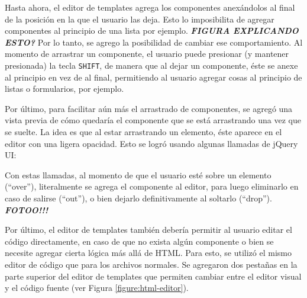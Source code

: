 \documentclass[12pt,titlepage,]{article}
\newenvironment{Shaded}{}{}
\newcommand{\KeywordTok}[1]{\textcolor[rgb]{0.00,0.44,0.13}{\textbf{{#1}}}}
\newcommand{\DataTypeTok}[1]{\textcolor[rgb]{0.56,0.13,0.00}{{#1}}}
\newcommand{\StringTok}[1]{\textcolor[rgb]{0.25,0.44,0.63}{{#1}}}
\newcommand{\CommentTok}[1]{\textcolor[rgb]{0.38,0.63,0.69}{\textit{{#1}}}}
\newcommand{\OtherTok}[1]{\textcolor[rgb]{0.00,0.44,0.13}{{#1}}}
\newcommand{\FunctionTok}[1]{\textcolor[rgb]{0.02,0.16,0.49}{{#1}}}
\newcommand{\NormalTok}[1]{{#1}}
\begin{document}
Hasta ahora, el editor de templates agrega los componentes anexándolos
al final de la posición en la que el usuario las deja. Esto lo
imposibilita de agregar componentes al principio de una lista por
ejemplo. \textbf{\emph{FIGURA EXPLICANDO ESTO?}} Por lo tanto, se agrego
la posibilidad de cambiar ese comportamiento. Al momento de arrastrar un
componente, el usuario puede presionar (y mantener presionada) la tecla
\texttt{SHIFT}, de manera que al dejar un componente, éste se anexe al
principio en vez de al final, permitiendo al usuario agregar cosas al
principio de listas o formularios, por ejemplo.

Por último, para facilitar aún más el arrastrado de componentes, se
agregó una vista previa de cómo quedaría el componente que se está
arrastrando una vez que se suelte. La idea es que al estar arrastrando
un elemento, éste aparece en el editor con una ligera opacidad. Esto se
logró usando algunas llamadas de jQuery UI:

\begin{Shaded}
\end{Shaded}

Con estas llamadas, al momento de que el usuario esté sobre un elemento
(``over''), literalmente se agrega el componente al editor, para luego
eliminarlo en caso de salirse (``out''), o bien dejarlo definitivamente
al soltarlo (``drop''). \textbf{\emph{FOTOO!!!}}

Por último, el editor de templates también debería permitir al usuario
editar el código directamente, en caso de que no exista algún componente
o bien se necesite agregar cierta lógica más allá de HTML. Para esto, se
utilizó el mismo editor de código que para los archivos normales. Se
agregaron dos pestañas en la parte superior del editor de templates que
permiten cambiar entre el editor visual y el código fuente (ver Figura
\ref{figure:html-editor}).
\end{document}
